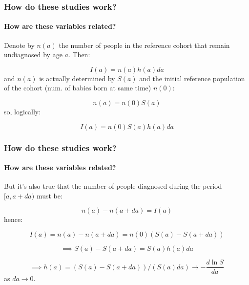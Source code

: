 \documentclass{beamer}
\begin{document}
\begin{frame}
    \frametitle{How do these studies work?}
    \framesubtitle{How are these variables related?}

    Denote by $n(a)$ the number of people in the reference cohort that remain
    undiagnosed by age $a$. Then:

    \begin{equation}
        I(a) = n(a) h(a) da
    \end{equation}
    and $n(a)$ is actually determined by $S(a)$ and the initial reference
    population of the cohort (num. of babies born at same time) $n(0)$:

    \begin{equation}
        n(a) = n(0) S(a)
    \end{equation}
    so, logically:

    \begin{equation}
        I(a) = n(0) S(a) h(a) da
    \end{equation}
\end{frame}

\begin{frame}
    \frametitle{How do these studies work?}
    \framesubtitle{How are these variables related?}

    But it's also true that the number of people diagnosed during the period 
    $[a, a + da)$ must be:

    \begin{equation}
        n(a) - n(a + da) = I(a)
    \end{equation}
    hence:

    \begin{equation*}
        I(a) = n(a) - n(a + da) = n(0) (S(a) - S(a + da))
    \end{equation*}

    \begin{equation*}
    \implies S(a) - S(a + da) = S(a) h(a) da
    \end{equation*}

    \begin{equation*}
    \implies h(a) = (S(a) - S(a + da)) / (S(a) da) \rightarrow -\frac{d \ln S}{ da}
    \end{equation*}
    as $da \rightarrow 0$.

\end{frame}
\end{document}

